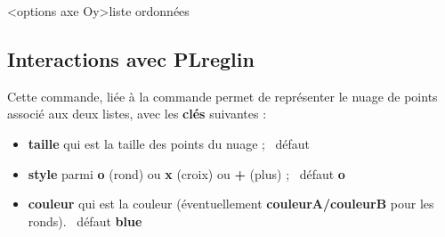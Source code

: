 \documentclass{article}
\newcommand\ctex[1]{\tcbox[vignettelatex]{#1}}
\newcommand\Cle[1]{{\bfseries\sffamily\textlangle #1\textrangle}}
\begin{document}
\begin{codetex}
	\PLfenetre                %
	<options axe Oy>{liste ordonnées}
\end{codetex}

%

\subsection{Interactions avec PLreglin}

\begin{codetex}
\end{codetex}

\begin{codecles}
Cette commande, liée à la commande \ctex{\textbackslash{}PLreglin} permet de représenter le nuage de points associé aux deux listes, avec les \Cle{clés} suivantes :

\begin{itemize}
	\item \Cle{taille} qui est la taille des points du nuage ; \hfill~défaut \Cle{2pt}
	\item \Cle{style} parmi \Cle{o} (rond) ou \Cle{x} (croix) ou \Cle{+} (plus) ; \hfill~défaut \Cle{o}
	\item \Cle{couleur} qui est la couleur (éventuellement \Cle{couleurA/couleurB} pour les ronds). \hfill~défaut \Cle{blue}
\end{itemize}
\end{codecles}

\begin{codetex}
\def\LLX{1994,1995,1996,1997,1998,1999,2000,2001,2002,2004,2005,2006,2007,2008,2009,2010}
\def\LLY{1718,1710,1708,1700,1698,1697,1691,1688,1683,1679,1671,1670,1663,1661,1656,1649}

\begin{tikzpicture}[...]
	\PLnuagepts[couleur=blue/red]{\LLX}{\LLY}
\end{tikzpicture}
~~
\begin{tikzpicture}[...]
	\PLnuagepts[couleur=ForestGreen,style=x,taille=6pt]{\LLX}{\LLY}
\end{tikzpicture}
\end{codetex}
\end{document}
